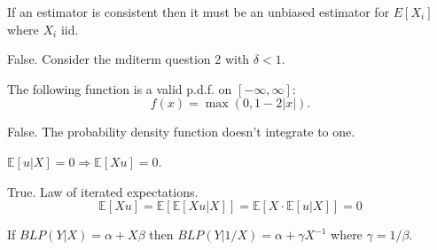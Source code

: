 \documentclass{exam}
\begin{document}
\begin{questions}
    \question If an estimator is consistent then it must be an unbiased estimator 
    for $E[X_i]$ where $X_i$ iid.


    \begin{solution}
    False. Consider the mditerm question 2 with $\delta < 1$.        



    \end{solution}


	\question The following function is a valid p.d.f. on $[-\infty, \infty]$:
		\[    f(x) = \max(0, 1 - 2 |x| ). \]

		\begin{solution}
		    False. The probability density function doesn't integrate to one.
		\end{solution}



    \question
    $\mathbb{E}[u|X] {=} 0 \Rightarrow \mathbb{E}[Xu] {=} 0$.
    \begin{solution}
    True. Law of iterated expectations. $$\mathbb{E}[X u] = \mathbb{E}[\mathbb{E}[X u|X]] = \mathbb{E}[X \cdot \mathbb{E}[u|X]] = 0$$
    \end{solution}

    \question If $BLP(Y | X) = \alpha + X \beta$ then $BLP(Y | 1/X) = \alpha +  \gamma X^{-1}$ where 
    $\gamma = 1/\beta$.


\end{questions}
\end{document}

